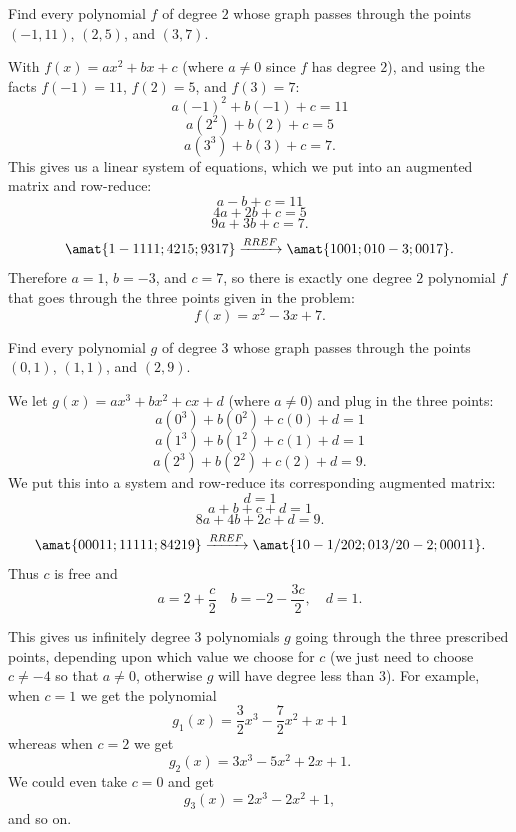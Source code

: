 \begin{problems}
\problem Find every polynomial $f$ of degree $2$ whose graph passes
through the points $(-1, 11)$, $(2, 5)$, and $(3, 7)$.

\begin{solution}
  With $f(x) = ax^2 + bx + c$ (where $a \neq 0$ since $f$ has degree
  $2$), and using the facts $f(-1)=11$, $f(2) = 5$, and $f(3) = 7$:
  \[a(-1)^2 + b(-1) + c = 11\]
  \[a(2^2) + b(2) + c = 5\]
  \[a(3^3) + b(3) + c = 7.\] This gives us a linear system of
  equations, which we put into an augmented matrix and row-reduce:
  \[a - b + c = 11\]
  \[4a + 2b + c = 5\]
  \[9a + 3b + c = 7.\]
  \[\amat{1 -1 1 11; 4 2 1 5; 9 3 1 7}
    \xrightarrow[]{RREF}
    \amat{1 0 0 1; 0 1 0 -3; 0 0 1 7}.\]
  Therefore $a=1$, $b= -3$, and $c=7$, so there is exactly one
  degree $2$ polynomial $f$ that goes through the three points given in the problem:
  \[f(x) = x^2 - 3x + 7.\]
\end{solution}

\problem Find every polynomial $g$ of degree $3$ whose graph passes
through the points $(0, 1)$, $(1, 1)$, and $(2, 9)$.

\begin{solution}
  We let $g(x) = ax^3 + bx^2 + cx + d$ (where $a \neq 0$) and plug in
  the three points:
  \[a(0^3)+b(0^2)+c(0)+d = 1\]
  \[a(1^3)+b(1^2)+c(1)+d = 1\]
  \[a(2^3)+b(2^2)+c(2)+d = 9.\] We put this into a system and
  row-reduce its corresponding augmented matrix:
  \[d = 1\]
  \[a + b + c + d = 1\]
  \[8a + 4b + 2c + d = 9.\]
  \[\amat{0 0 0 1 1; 1 1 1 1 1; 8 4 2 1 9}
    \xrightarrow[]{RREF} \amat{1 0 -1/2 0 2; 0 1 3/2 0 -2; 0 0 0 1
      1}.\] Thus $c$ is free and
  \[a = 2 + \frac{c}{2} \quad b = -2 - \frac{3c}{2}, \quad d = 1.\]

  This gives us infinitely degree $3$ polynomials $g$ going through
  the three prescribed points, depending upon which value we choose
  for $c$ (we just need to choose $c \neq -4$ so that $a \neq 0$,
  otherwise $g$ will have degree less than $3$).  For example, when
  $c = 1$ we get the polynomial
  \[g_1(x) = \frac{3}{2} x^3 - \frac{7}{2}x^2 + x + 1\]
  whereas when $c = 2$ we get
  \[g_2(x) = 3x^3 - 5x^2 + 2x + 1.\]
  We could even take $c = 0$ and get
  \[g_3(x) = 2x^3 - 2x^2 + 1,\]
  and so on.
\end{solution}

\end{problems}\setcounter{problem}{0}

%
%
\newpage
%
%

